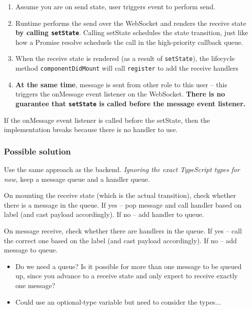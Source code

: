 \documentclass{article}
\begin{document}
\begin{enumerate}
\item
Assume you are on send state, user triggers
event to perform send.
\item
Runtime performs the send over the WebSocket
and renders the receive state \textbf{by
calling \texttt{setState}}. Calling setState 
schedules the state transition, just like
how a Promise resolve scheduels the call in
the high-priority callback queue.

\item When the receive state is rendered (as a 
result of \texttt{setState}), the lifecycle
method \texttt{componentDidMount} will call \texttt{register} to add the receive handlers 

\item \textbf{At the same time}, message is sent from
other role to this user -- this triggers the 
onMessage event listener on the WebSocket. 
\textbf{There is no guarantee that \texttt{setState} 
is called before the message event listener.}

\end{enumerate}

If the onMessage event listener
is called before the setState,
then the implementation breaks because there is no
handler to use.

\subsubsection*{Possible solution}

Use the same approach as the backend.
\textit{Ignoring the exact TypeScript types for now,}
keep a message queue and a handler queue.

On mounting the receive state (which is the actual
transition), check whether there is a message in the 
queue.
If yes -- pop message and call handler based on label
(and cast payload accordingly).
If no -- add handler to queue.

On message receive, check whether there are handlers
in the queue. 
If yes -- call the correct one based on
the label (and cast payload accordingly).
If no -- add message to queue.

\begin{itemize}
\item
Do we need a queue? Is it possible for more than
one message to be queued up, since you advance to
a receive state and only expect to receive exactly
one message? 

\item
Could use an optional-type variable
but need to consider the types...
\end{itemize}
\end{document}
